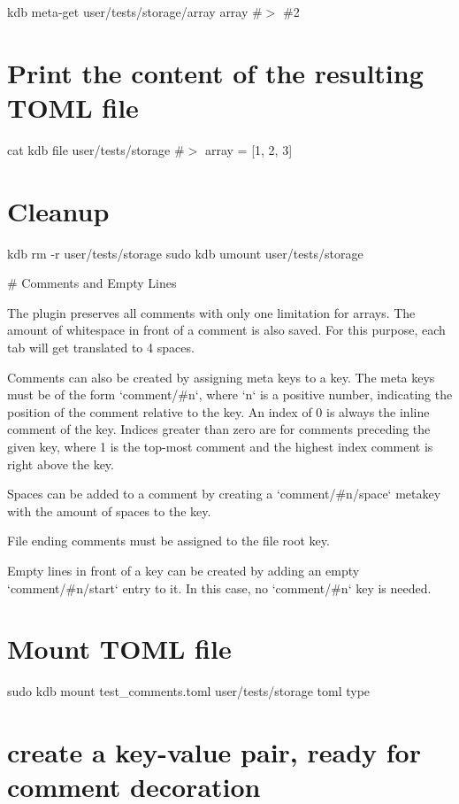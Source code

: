 kdb meta-\/get \textquotesingle{}user/tests/storage/array\textquotesingle{} \textquotesingle{}array\textquotesingle{} \#$>$ \#2\hypertarget{autotoc_md693_autotoc_md776}{}\section{Print the content of the resulting T\+O\+M\+L file}\label{autotoc_md693_autotoc_md776}
cat {\ttfamily kdb file user/tests/storage} \#$>$ array = \mbox{[}1, 2, 3\mbox{]}\hypertarget{autotoc_md693_autotoc_md777}{}\section{Cleanup}\label{autotoc_md693_autotoc_md777}
kdb rm -\/r user/tests/storage sudo kdb umount user/tests/storage 
\begin{DoxyCode}
# Comments and Empty Lines

The plugin preserves all comments with only one limitation for arrays. The amount of whitespace in front of
       a comment is also saved.
For this purpose, each tab will get translated to 4 spaces.

Comments can also be created by assigning meta keys to a key.
The meta keys must be of the form `comment/#n`, where `n` is a positive number, indicating the position of
       the comment relative to the key.
An index of 0 is always the inline comment of the key.
Indices greater than zero are for comments preceding the given key, where 1 is the top-most comment and the
       highest index comment is right above the key.

Spaces can be added to a comment by creating a `comment/#n/space` metakey with the amount of spaces to the
       key.

File ending comments must be assigned to the file root key.

Empty lines in front of a key can be created by adding an empty `comment/#n/start` entry to it. In this
       case, no `comment/#n` key is needed.
\end{DoxyCode}
 \hypertarget{autotoc_md693_autotoc_md778}{}\section{Mount T\+O\+M\+L file}\label{autotoc_md693_autotoc_md778}
sudo kdb mount test\+\_\+comments.\+toml user/tests/storage toml type\hypertarget{autotoc_md693_autotoc_md779}{}\section{create a key-\/value pair, ready for comment decoration}\label{autotoc_md693_autotoc_md779}
